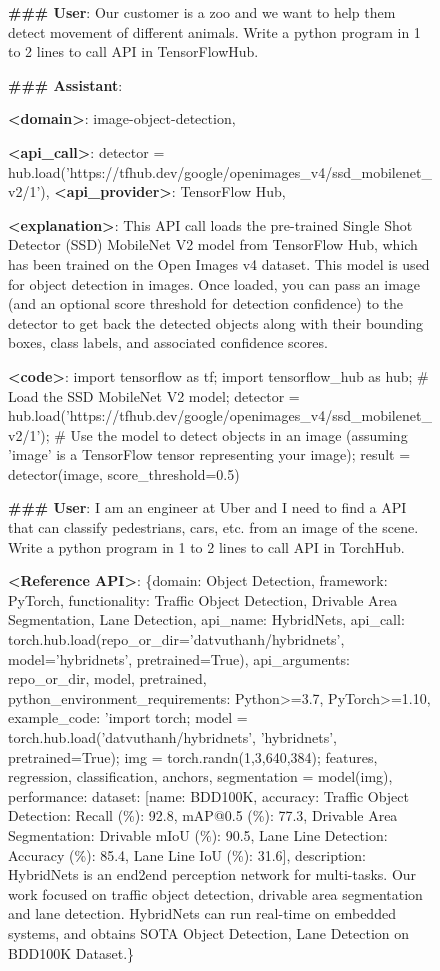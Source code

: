 \begin{figure}
\begin{tcolorbox}
    \textbf{\#\#\# User}: Our customer is a zoo and we want to help them detect movement of different animals. Write a python program in 1 to 2 lines to call API in TensorFlowHub.
    
    \textbf{\#\#\# Assistant}: 
    
    \textbf{<domain>}: image-object-detection,
    
    \textbf{<api\_call>}: detector = hub.load('https://tfhub.dev/google/openimages\_v4/ssd\_mobilenet\_v2/1'),
    \textbf{<api\_provider>}: TensorFlow Hub,
    
    \textbf{<explanation>}: This API call loads the pre-trained Single Shot Detector (SSD) MobileNet V2 model from TensorFlow Hub, which has been trained on the Open Images v4 dataset. This model is used for object detection in images. Once loaded, you can pass an image (and an optional score threshold for detection confidence) to the detector to get back the detected objects along with their bounding boxes, class labels, and associated confidence scores.
    
    \textbf{<code>}: import tensorflow as tf; import tensorflow\_hub as hub; \# Load the SSD MobileNet V2 model; detector = hub.load('https://tfhub.dev/google/openimages\_v4/ssd\_mobilenet\_v2/1'); \# Use the model to detect objects in an image (assuming 'image' is a TensorFlow tensor representing your image); result = detector(image, score\_threshold=0.5)
\end{tcolorbox}
\begin{tcolorbox}
    \textbf{\#\#\# User}: I am an engineer at Uber and I need to find a API that can classify pedestrians, cars, etc. from an image of the scene. Write a python program in 1 to 2 lines to call API in TorchHub.

    \textbf{<Reference API>}: \{domain: Object Detection, framework: PyTorch, functionality: Traffic Object Detection, Drivable Area Segmentation, Lane Detection, api\_name: HybridNets, api\_call: torch.hub.load(repo\_or\_dir='datvuthanh/hybridnets', model='hybridnets', pretrained=True), api\_arguments: repo\_or\_dir, model, pretrained, python\_environment\_requirements: Python>=3.7, PyTorch>=1.10, example\_code: 'import torch; model = torch.hub.load('datvuthanh/hybridnets', 'hybridnets', pretrained=True); img = torch.randn(1,3,640,384); features, regression, classification, anchors, segmentation = model(img), performance: {dataset: [{name: BDD100K, accuracy: {Traffic Object Detection: {Recall (\%): 92.8, mAP@0.5 (\%): 77.3}, Drivable Area Segmentation: {Drivable mIoU (\%): 90.5}, Lane Line Detection: {Accuracy (\%): 85.4, Lane Line IoU (\%): 31.6}}}]}, description: HybridNets is an end2end perception network for multi-tasks. Our work focused on traffic object detection, drivable area segmentation and lane detection. HybridNets can run real-time on embedded systems, and obtains SOTA Object Detection, Lane Detection on BDD100K Dataset.\}


\end{tcolorbox}
\end{figure}
